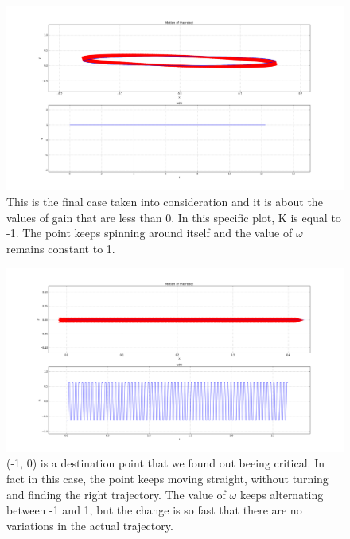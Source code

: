 \documentclass[a4paper,11pt,oneside]{book}
\begin{document}
\begin{figure}[H]
\centering
\hspace*{-2.3in}
\includegraphics[width=1.9\textwidth]{figs/simulations/3_2}
\caption[Simulation: K = -1]{This is the final case taken into consideration and it is about the values of gain that are less than 0. In this specific plot, K is equal to -1. The point keeps spinning around itself and the value of $\omega$ remains constant to 1.}
\end{figure}

\begin{figure}[H]
\centering
\hspace*{-2.3in}
\includegraphics[width=1.9\textwidth]{figs/simulations/critical}
\caption[Simulation: K = 1, Destination (-1, 0)]{(-1, 0) is a destination point that we found out beeing critical. In fact in this case, the point keeps moving straight, without turning and finding the right trajectory. The value of $\omega$ keeps alternating between -1 and 1, but the change is so fast that there are no variations in the actual trajectory.}
\end{figure}
\end{document}
